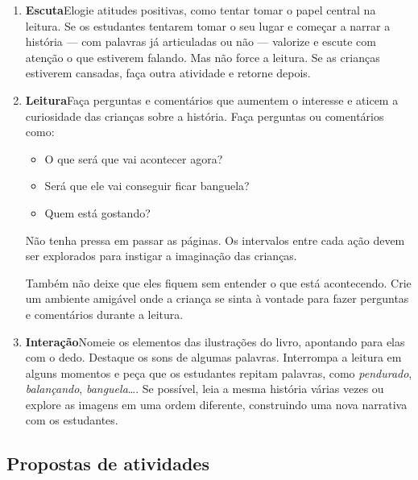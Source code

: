\documentclass[11pt]{extarticle}
\begin{document}
\begin{enumerate}
\item \textbf{Escuta}\quad Elogie atitudes positivas, como 
tentar tomar o papel central na leitura. Se os estudantes tentarem 
tomar o seu lugar e começar a narrar a história --- com palavras já articuladas 
ou não --- valorize e escute com atenção o que estiverem falando. Mas não 
force a leitura. Se as crianças estiverem cansadas, faça outra atividade 
e retorne depois. 

\item \textbf{Leitura}\quad Faça perguntas e comentários que aumentem o 
interesse e aticem a curiosidade das crianças sobre a história. Faça 
perguntas ou comentários como: 

\begin{itemize}
\item O que será que vai acontecer agora?
\item Será que ele vai conseguir ficar banguela?
\item Quem está gostando?
\end{itemize}

Não tenha pressa em passar as páginas. Os intervalos entre
cada ação devem ser explorados para instigar a imaginação
das crianças.

Também não deixe que eles fiquem sem entender o que está acontecendo. 
Crie um ambiente amigável onde a criança se sinta à vontade para fazer 
perguntas e comentários durante a leitura.


\item \textbf{Interação}\quad Nomeie os elementos das ilustrações 
do livro, apontando para elas com o dedo. Destaque os sons de algumas 
palavras. Interrompa a leitura em alguns momentos e peça que 
os estudantes repitam palavras, como \textit{pendurado}, \textit{balançando}, \textit{banguela}\dots{}. Se possível, 
leia a mesma história várias vezes ou explore as imagens em uma ordem 
diferente, construindo uma nova narrativa com os estudantes. 
\end{enumerate}


\subsection{Propostas de atividades}
 
\end{document}
